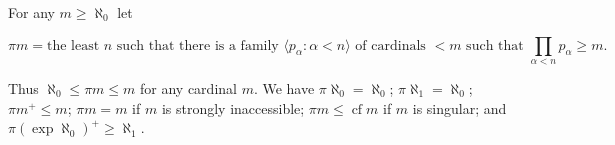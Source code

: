 For any $m \geq \aleph_0$ let

$$\pi m = \text{the least } n \text{ such that there is a family } \langle p_\alpha : \alpha < n \rangle \text{ of cardinals } < m \text{ such that } \prod_{\alpha < n} p_\alpha \geq m.$$

Thus $\aleph_0 \leq \pi m \leq m$ for any cardinal $m$. We have $\pi \aleph_0 = \aleph_0$; $\pi \aleph_1 = \aleph_0$; $\pi m^+ \leq m$; $\pi m = m$ if $m$ is strongly inaccessible; $\pi m \leq \operatorname{cf} m$ if $m$ is singular; and $\pi(\exp \aleph_0)^+ \geq \aleph_1$.
